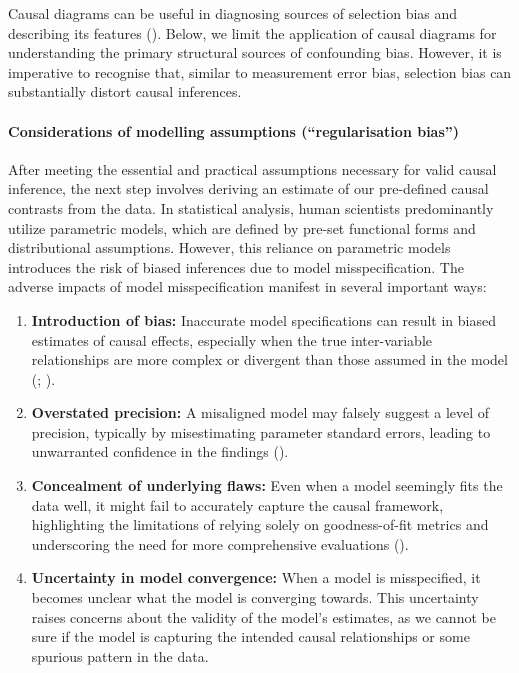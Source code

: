 \documentclass[
  singlecolumn,
  9pt]{article}
\let\oldparagraph\paragraph
\renewcommand{\paragraph}[1]{\oldparagraph{#1}\mbox{}}
\begin{document}
Causal diagrams can be useful in diagnosing sources of selection bias
and describing its features ().
Below, we limit the application of causal diagrams for understanding the
primary structural sources of confounding bias. However, it is
imperative to recognise that, similar to measurement error bias,
selection bias can substantially distort causal inferences.

\paragraph{Considerations of modelling assumptions (``regularisation
bias'')}\label{considerations-of-modelling-assumptions-regularisation-bias}

After meeting the essential and practical assumptions necessary for
valid causal inference, the next step involves deriving an estimate of
our pre-defined causal contrasts from the data. In statistical analysis,
human scientists predominantly utilize parametric models, which are
defined by pre-set functional forms and distributional assumptions.
However, this reliance on parametric models introduces the risk of
biased inferences due to model misspecification. The adverse impacts of
model misspecification manifest in several important ways:

\begin{enumerate}
\def\labelenumi{\arabic{enumi}.}
\item
  \textbf{Introduction of bias:} Inaccurate model specifications can
  result in biased estimates of causal effects, especially when the true
  inter-variable relationships are more complex or divergent than those
  assumed in the model (; ).
\item
  \textbf{Overstated precision:} A misaligned model may falsely suggest
  a level of precision, typically by misestimating parameter standard
  errors, leading to unwarranted confidence in the findings
  ().
\item
  \textbf{Concealment of underlying flaws:} Even when a model seemingly
  fits the data well, it might fail to accurately capture the causal
  framework, highlighting the limitations of relying solely on
  goodness-of-fit metrics and underscoring the need for more
  comprehensive evaluations
  ().
\item
  \textbf{Uncertainty in model convergence:} When a model is
  misspecified, it becomes unclear what the model is converging towards.
  This uncertainty raises concerns about the validity of the model's
  estimates, as we cannot be sure if the model is capturing the intended
  causal relationships or some spurious pattern in the data.
\end{enumerate}
\end{document}
